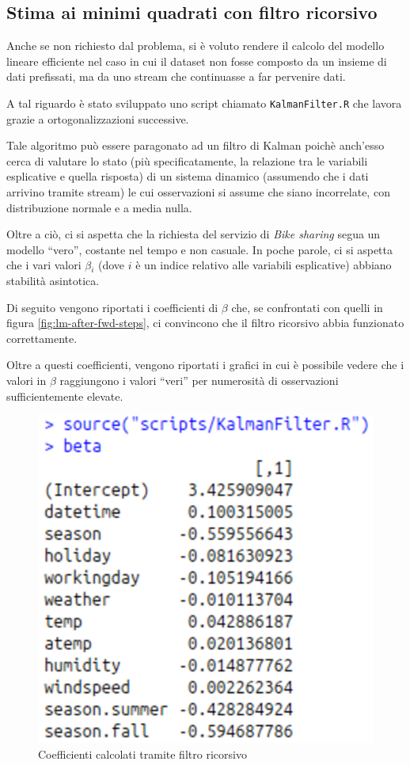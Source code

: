 
\subsection{Stima ai minimi quadrati con filtro ricorsivo}
Anche se non richiesto dal problema, si è voluto rendere il calcolo del
modello lineare efficiente nel caso in cui il dataset non fosse composto da un
insieme di dati prefissati, ma da uno stream che continuasse a far pervenire
dati.

A tal riguardo è stato sviluppato uno script chiamato \texttt{KalmanFilter.R}
che lavora grazie a ortogonalizzazioni successive.

Tale algoritmo può essere paragonato ad un filtro di Kalman poichè anch'esso
cerca di valutare lo stato (più specificatamente, la relazione tra le
variabili esplicative e quella risposta) di un sistema dinamico (assumendo che
i dati arrivino tramite stream) le cui osservazioni si assume che siano
incorrelate, con distribuzione normale e a media nulla.

Oltre a ciò, ci si aspetta che la richiesta del servizio di \emph{Bike sharing}
segua un modello ``vero'', costante nel tempo e non casuale. In poche parole,
ci si aspetta che i vari valori $ \beta{}_i $ (dove $i$ è un indice relativo
alle variabili esplicative) abbiano stabilità asintotica.

Di seguito vengono riportati i coefficienti di $ \beta{} $ che, se confrontati
con quelli in figura \ref{fig:lm-after-fwd-steps}, ci convincono che il filtro
ricorsivo abbia funzionato correttamente.

Oltre a questi coefficienti, vengono riportati i grafici in cui è possibile
vedere che i valori in $ \beta{} $ raggiungono i valori ``veri'' per numerosità
di osservazioni sufficientemente elevate.


\begin{figure}[H]
  \centering
  \includegraphics[width=.55\columnwidth]{images/lm/kalman-beta.eps}
  \caption{Coefficienti calcolati tramite filtro ricorsivo}
    \label{fig:kalman-beta}
\end{figure}

